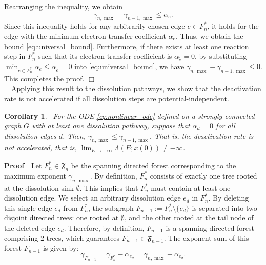 \documentclass[11pt,a4paper]{article}
\newtheorem{coll}{Corollary}[section]
\begin{document}
Rearranging the inequality, we obtain
\begin{equation}
\gamma_{n, \max} - \gamma_{n-1, \max} \le \alpha_e.
\end{equation}
Since this inequality holds for any arbitrarily chosen edge $e \in F_n^*$, it holds for the edge with the minimum electron transfer coefficient $\alpha_e$. Thus, we obtain the bound \eqref{eq:universal_bound}. Furthermore, if there exists at least one reaction step in $F_n^*$ such that its electron transfer coefficient is $\alpha_{\tilde e} = 0$, by substituting $\min_{e \in F_n^*} \alpha_e \le \alpha_{\tilde e} = 0$ into \eqref{eq:universal_bound}, we have $\gamma_{n, \max} - \gamma_{n-1, \max} \le 0$. \\
This completes the proof. \hfill $\Box$\\[0.2cm]
~~Applying this result to the dissolution pathways, we show that the deactivation rate is not accelerated if all dissolution steps are potential-independent.
\begin{coll}~For the ODE \eqref{eq:nonlinear_ode} defined on a strongly connected graph $G$ with at least one dissolution pathway, suppose that $\alpha_d = 0$ for all dissolution edges $d$. Then, $\gamma_{n, \max} \le \gamma_{n-1, \max}$. That is, the deactivation rate is not accelerated, that is, $\lim_{E \to +\infty}\Lambda(E;x(0)) \not = -\infty$.
\end{coll}
\noindent
{\bf Proof}~~Let $F_n^* \in \mathfrak{F}_n$ be the spanning directed forest corresponding to the maximum exponent $\gamma_{n, \max}$. By definition, $F_n^*$ consists of exactly one tree rooted at the dissolution sink $\emptyset$. This implies that $F_n^*$ must contain at least one dissolution edge. We select an arbitrary dissolution edge $e_d$ in $F_n^*$. By deleting this single edge $e_d$ from $F_n^*$, the subgraph $F_{n-1} := F_n^* \setminus \{e_d\}$ is separated into two disjoint directed trees: one rooted at $\emptyset$, and the other rooted at the tail node of the deleted edge $e_d$. Therefore, by definition, $F_{n-1}$ is a spanning directed forest comprising 2 trees, which guarantees $F_{n-1} \in \mathfrak{F}_{n-1}$. The exponent sum of this forest $F_{n-1}$ is given by:
\begin{equation}
\gamma_{F_{n-1}} = \gamma_{F_n^*} - \alpha_{e_d} = \gamma_{n, \max} - \alpha_{e_d}.
\end{equation}
\end{document}
